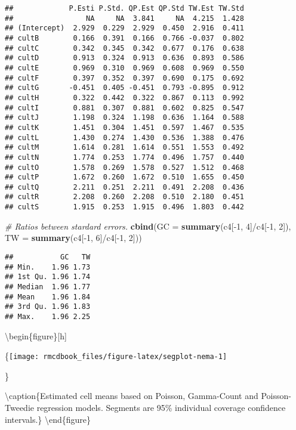 \documentclass[9pt,a5paper,]{book}
\newenvironment{Shaded}{}{}
\newcommand{\KeywordTok}[1]{\textbf{{#1}}}
\newcommand{\DataTypeTok}[1]{\underline{{#1}}}
\newcommand{\DecValTok}[1]{{#1}}
\newcommand{\CommentTok}[1]{\textit{{#1}}}
\newcommand{\NormalTok}[1]{{#1}}
\renewenvironment{Shaded}{\color{inputcolor}}{}
\renewcommand{\DataTypeTok}[1]{{#1}}
\theoremstyle{definition}
\theoremstyle{definition}
\theoremstyle{remark}
\begin{document}
\begin{verbatim}
##             P.Esti P.Std. QP.Est QP.Std TW.Est TW.Std
##                 NA     NA  3.841     NA  4.215  1.428
## (Intercept)  2.929  0.229  2.929  0.450  2.916  0.411
## cultB        0.166  0.391  0.166  0.766 -0.037  0.802
## cultC        0.342  0.345  0.342  0.677  0.176  0.638
## cultD        0.913  0.324  0.913  0.636  0.893  0.586
## cultE        0.969  0.310  0.969  0.608  0.969  0.550
## cultF        0.397  0.352  0.397  0.690  0.175  0.692
## cultG       -0.451  0.405 -0.451  0.793 -0.895  0.912
## cultH        0.322  0.442  0.322  0.867  0.113  0.992
## cultI        0.881  0.307  0.881  0.602  0.825  0.547
## cultJ        1.198  0.324  1.198  0.636  1.164  0.588
## cultK        1.451  0.304  1.451  0.597  1.467  0.535
## cultL        1.430  0.274  1.430  0.536  1.388  0.476
## cultM        1.614  0.281  1.614  0.551  1.553  0.492
## cultN        1.774  0.253  1.774  0.496  1.757  0.440
## cultO        1.578  0.269  1.578  0.527  1.512  0.468
## cultP        1.672  0.260  1.672  0.510  1.655  0.450
## cultQ        2.211  0.251  2.211  0.491  2.208  0.436
## cultR        2.208  0.260  2.208  0.510  2.180  0.451
## cultS        1.915  0.253  1.915  0.496  1.803  0.442
\end{verbatim}

\begin{Shaded}
\begin{Highlighting}[]
\CommentTok{# Ratios between stardard errors.}
\KeywordTok{cbind}\NormalTok{(}\DataTypeTok{GC =} \KeywordTok{summary}\NormalTok{(c4[-}\DecValTok{1}\NormalTok{, }\DecValTok{4}\NormalTok{]/c4[-}\DecValTok{1}\NormalTok{, }\DecValTok{2}\NormalTok{]),}
      \DataTypeTok{TW =} \KeywordTok{summary}\NormalTok{(c4[-}\DecValTok{1}\NormalTok{, }\DecValTok{6}\NormalTok{]/c4[-}\DecValTok{1}\NormalTok{, }\DecValTok{2}\NormalTok{]))}
\end{Highlighting}
\end{Shaded}

\begin{verbatim}
##           GC   TW
## Min.    1.96 1.73
## 1st Qu. 1.96 1.74
## Median  1.96 1.77
## Mean    1.96 1.84
## 3rd Qu. 1.96 1.83
## Max.    1.96 2.25
\end{verbatim}

\textbackslash{}begin\{figure\}{[}h{]}

\{\centering \texttt{[image: rmcdbook\_files/figure-latex/segplot-nema-1]}

\}

\textbackslash{}caption\{Estimated cell means based on Poisson,
Gamma-Count and Poisson-Tweedie regression models. Segments are 95\%
individual coverage confidence intervals.\}\label{fig:segplot-nema}
\textbackslash{}end\{figure\}
\end{document}
